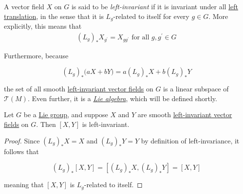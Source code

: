 \documentclass{article}
\newcounter{definition}[section]
\begin{document}
    \begin{definition}
      \label{def:left-invariant-vector-field}
      A vector field $X$ on $G$ is said to be \textit{left-invariant} if it is invariant under all \hyperref[def:left-and-right-translation]{left translation}, in the sense that it is $L_g$-related to itself for every $g \in G$. More explicitly, this means that
      \begin{align*}
        (L_g)_* X_{g^\prime} = X_{g g^\prime} \text{ for all } g, g^\prime \in G
      \end{align*}
    \end{definition}

    Furthermore, because

      \begin{equation}
        (L_g)_* \big( a X + b Y \big) = a (L_g)_* X + b (L_g)_* Y
      \end{equation}

    the set of all smooth \hyperref[def:left-invariant-vector-field]{left-invariant vector fields} on $G$ is a linear subspace of $\mathcal{T}(M)$. Even further, it is a \textit{\hyperref[def:lie-algebra]{Lie algebra}}, which will be defined shortly.  

    \begin{lemma}
      \label{thm:left-invariance-is-preserved-by-the-lie-bracket}
      Let $G$ be a \hyperref[def:lie-group]{Lie group}, and suppose $X$ and $Y$ are smooth \hyperref[def:left-invariant-vector-field]{left-invariant vector fields} on $G$. Then $[X, Y]$ is left-invariant. 
    \end{lemma}
    \begin{proof}
      Since $(L_g)_* X = X$ and $(L_g)_* Y = Y$ by definition of left-invariance, it follows that

        \begin{equation}
          (L_g)_* [X,Y] = [(L_g)_* X, (L_g)_* Y] = [X,Y]
        \end{equation}

      meaning that $[X, Y]$ is $L_g$-related to itself. 
    \end{proof}
\end{document}
